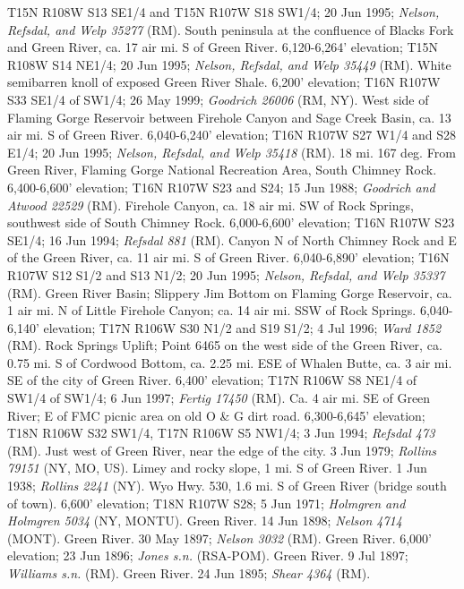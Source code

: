 T15N R108W S13 SE1/4 and T15N R107W S18 SW1/4; 20 Jun 1995;
\textit{Nelson, Refsdal, and Welp 35277} (RM).
South peninsula at the confluence of Blacks Fork and Green River, ca. 17 air mi.
S of Green River. 6,120-6,264' elevation; T15N R108W S14 NE1/4; 20 Jun 1995;
\textit{Nelson, Refsdal, and Welp 35449} (RM).
White semibarren knoll of exposed Green River Shale. 6,200' elevation;
T16N R107W S33 SE1/4 of SW1/4; 26 May 1999; \textit{Goodrich 26006} (RM, NY).
West side of Flaming Gorge Reservoir between Firehole Canyon and Sage Creek
Basin, ca. 13 air mi. S of Green River. 6,040-6,240' elevation; T16N R107W S27
W1/4 and S28 E1/4; 20 Jun 1995; \textit{Nelson, Refsdal, and Welp 35418} (RM).
18 mi. 167 deg. From Green River, Flaming Gorge National Recreation Area, South
Chimney Rock. 6,400-6,600' elevation; T16N R107W S23 and S24; 15 Jun 1988;
\textit{Goodrich and Atwood 22529} (RM).
Firehole Canyon, ca. 18 air mi. SW of Rock Springs, southwest side of South
Chimney Rock. 6,000-6,600' elevation; T16N R107W S23 SE1/4; 16 Jun 1994;
\textit{Refsdal 881} (RM).
Canyon N of North Chimney Rock and E of the Green River, ca. 11 air mi. S of
Green River. 6,040-6,890' elevation; T16N R107W S12 S1/2 and S13 N1/2;
20 Jun 1995; \textit{Nelson, Refsdal, and Welp 35337} (RM).
Green River Basin; Slippery Jim Bottom on Flaming Gorge Reservoir, ca. 1 air mi.
N of Little Firehole Canyon; ca. 14 air mi. SSW of Rock Springs.
6,040-6,140' elevation; T17N R106W S30 N1/2 and S19 S1/2; 4 Jul 1996;
\textit{Ward 1852} (RM).
Rock Springs Uplift; Point 6465 on the west side of the Green River, ca. 0.75
mi. S of Cordwood Bottom, ca. 2.25 mi. ESE of Whalen Butte, ca. 3 air mi. SE of
the city of Green River. 6,400' elevation; T17N R106W S8 NE1/4 of SW1/4 of SW1/4;
6 Jun 1997; \textit{Fertig 17450} (RM).
Ca. 4 air mi. SE of Green River; E of FMC picnic area on old O \& G dirt road.
6,300-6,645' elevation; T18N R106W S32 SW1/4, T17N R106W S5 NW1/4; 3 Jun 1994;
\textit{Refsdal 473} (RM).
Just west of Green River, near the edge of the city. 3 Jun 1979;
\textit{Rollins 79151} (NY, MO, US).
Limey and rocky slope, 1 mi. S of Green River. 1 Jun 1938;
\textit{Rollins 2241} (NY).
Wyo Hwy. 530, 1.6 mi. S of Green River (bridge south of town). 6,600' elevation;
T18N R107W S28; 5 Jun 1971; \textit{Holmgren and Holmgren 5034} (NY, MONTU).
Green River. 14 Jun 1898; \textit{Nelson 4714} (MONT).
Green River. 30 May 1897; \textit{Nelson 3032} (RM).
Green River. 6,000' elevation; 23 Jun 1896; \textit{Jones s.n.} (RSA-POM).
Green River. 9 Jul 1897; \textit{Williams s.n.} (RM).
Green River. 24 Jun 1895; \textit{Shear 4364} (RM).
